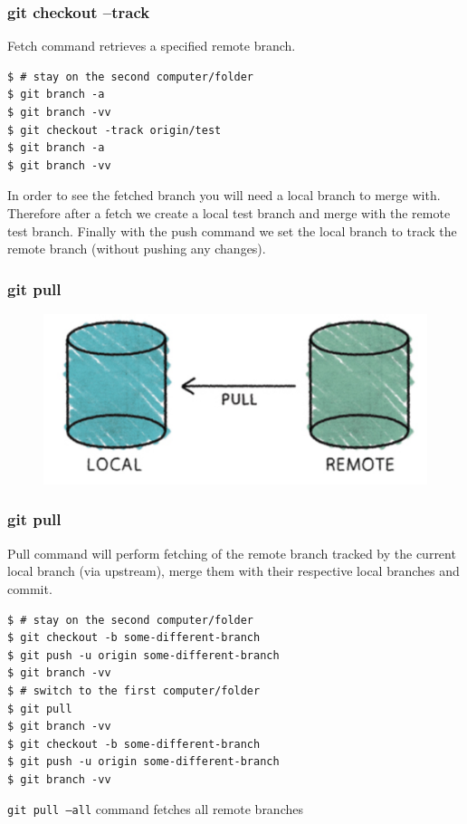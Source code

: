 \documentclass{beamer}
\begin{document}
\begin{frame}[fragile]
\frametitle{git checkout --track}

Fetch command retrieves a specified remote branch.

\begin{lstlisting}
$ # stay on the second computer/folder
$ git branch -a
$ git branch -vv
$ git checkout -track origin/test
$ git branch -a
$ git branch -vv
\end{lstlisting}

In order to see the fetched branch you will need a local branch to
merge with. Therefore after a fetch we create a local test branch and
merge with the remote test branch. Finally with the push command we
set the local branch to track the remote branch (without pushing any
changes).


\end{frame}


\begin{frame}[fragile]
\frametitle{git pull}
\begin{figure}

  \includegraphics[scale=0.3]{figures/f7.png}
\end{figure}
\end{frame}

\begin{frame}[fragile]
\frametitle{git pull}

Pull command will perform fetching of the remote branch tracked by the
current local branch (via upstream), merge them with their
respective local branches and commit.


\begin{lstlisting}
$ # stay on the second computer/folder
$ git checkout -b some-different-branch
$ git push -u origin some-different-branch
$ git branch -vv
$ # switch to the first computer/folder
$ git pull
$ git branch -vv
$ git checkout -b some-different-branch
$ git push -u origin some-different-branch
$ git branch -vv
\end{lstlisting}

\texttt{git pull ---all} command fetches all remote branches

\end{frame}
\end{document}
